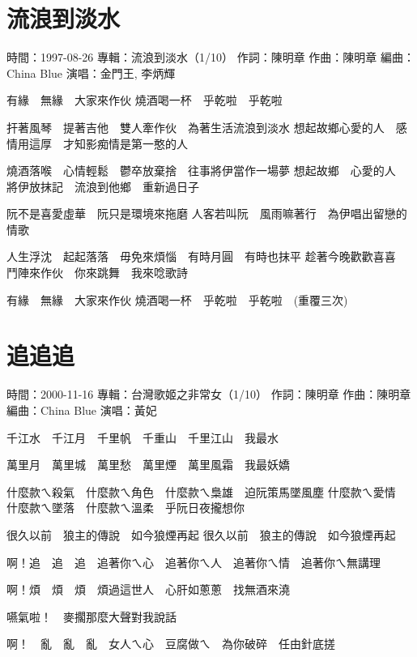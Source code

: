 \documentclass[UTF8,a4paper,oneside,twocolumn,12pt]{ctexbook}
\newcommand{\infopair}[2]{\textbullet #1：#2}
\newcommand{\zc}[1][伍佰]{\infopair{作詞}{#1}}
\newcommand{\zq}[1][伍佰]{\infopair{作曲}{#1}}
\newcommand{\bq}[1][伍佰]{\infopair{編曲}{#1}}
\newcommand{\zj}[1]{\infopair{專輯}{#1}}
\newcommand{\sj}[1]{\infopair{時間}{#1}}
\newenvironment{info}{\begin{flushleft}\kaishu
	}
	{\end{flushleft}\normalsize\yahei\par}
\newenvironment{lyric}{
	}
{}
\begin{document}
\section{流浪到淡水}
\begin{info}
	\sj{1997-08-26} %
	\zj{流浪到淡水（1/10）}
	\zc[陳明章]
	\zq[陳明章]
	\bq[China Blue]
	\infopair{演唱}{金門王, 李炳輝}
\end{info}
\begin{lyric}
	有緣　無緣　大家來作伙
	燒酒喝一杯　乎乾啦　乎乾啦

	扞著風琴　提著吉他　雙人牽作伙　為著生活流浪到淡水
	想起故鄉心愛的人　感情用這厚　才知影痴情是第一憨的人

	燒酒落喉　心情輕鬆　鬱卒放棄捨　往事將伊當作一場夢
	想起故鄉　心愛的人　將伊放抹記　流浪到他鄉　重新過日子

	阮不是喜愛虛華　阮只是環境來拖磨
	人客若叫阮　風雨嘛著行　為伊唱出留戀的情歌

	人生浮沈　起起落落　毋免來煩惱　有時月圓　有時也抹平
	趁著今晚歡歡喜喜　鬥陣來作伙　你來跳舞　我來唸歌詩

	有緣　無緣　大家來作伙
	燒酒喝一杯　乎乾啦　乎乾啦　(重覆三次)
\end{lyric}

\section{追追追}
\begin{info}
	\sj{2000-11-16}
	\zj{台灣歌姬之非常女（1/10）}
	\zc[陳明章]
	\zq[陳明章]
	\bq[China Blue]
	\infopair{演唱}{黃妃}
\end{info}
\begin{lyric}
	千江水　千江月　千里帆　千重山　千里江山　我最水

	萬里月　萬里城　萬里愁　萬里煙　萬里風霜　我最妖嬌

	什麼款ㄟ殺氣　什麼款ㄟ角色　什麼款ㄟ梟雄　迫阮策馬墜風塵
	什麼款ㄟ愛情　什麼款ㄟ墜落　什麼款ㄟ溫柔　乎阮日夜攏想你

	很久以前　狼主的傳說　如今狼煙再起
	很久以前　狼主的傳說　如今狼煙再起

	啊！追　追　追　追著你ㄟ心　追著你ㄟ人　追著你ㄟ情　追著你ㄟ無講理

	啊！煩　煩　煩　煩過這世人　心肝如蔥蔥　找無酒來澆

	嚥氣啦！　麥擱那麼大聲對我說話

	啊！　亂　亂　亂　女人ㄟ心　豆腐做ㄟ　為你破碎　任由針底搓
\end{lyric}
\end{document}
